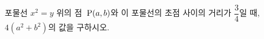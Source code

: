 포물선 $x^2=y$ 위의 점~$\mathrm{P}(a{,}\mkern3mu\mathopen{}b)$와 이 포물선의 초점 사이의 거리가 $\dfrac{3}{4}$일 때, $4(a^2+b^2)$의 값을 구하시오.
